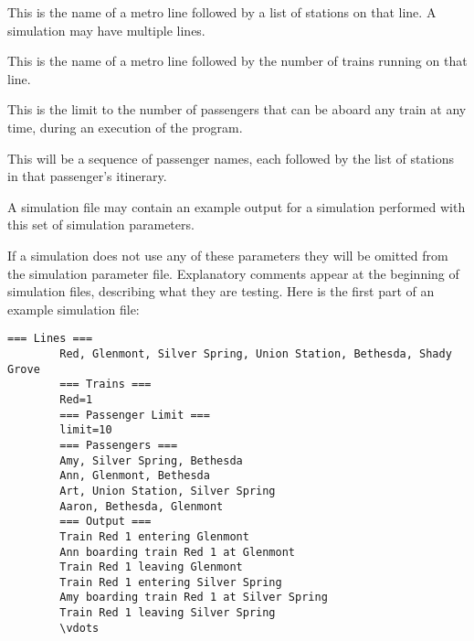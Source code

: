 \documentclass[11pt]{article}
\begin{document}
      \begin{description}

        \addtolength{\itemsep}{-1.5mm}

        \item[Metro lines:] This is the name of a metro line followed by a
              list of stations on that line.  A simulation may have multiple
              lines.

        \item[Metro trains:] This is the name of a metro line followed by
              the number of trains running on that line.

        \item[Passenger limit:] This is the limit to the number of
              passengers that can be aboard any train at any time, during an
              execution of the program.

        \item[Passengers:] This will be a sequence of passenger names, each
              followed by the list of stations in that passenger's itinerary.

        \item[Simulation output:] A simulation file may contain an example
              output for a simulation performed with this set of simulation
              parameters.

      \end{description}

      \vspace{-2mm}

      If a simulation does not use any of these parameters they will be
    omitted from the simulation parameter file.  Explanatory comments appear
    at the beginning of simulation files, describing what they are testing.
    Here is the first part of an example simulation file:

      \vspace{-2mm}

      \begin{center}

        \begin{BVerbatim}[commandchars=\\\{\}]
        === Lines ===
        Red, Glenmont, Silver Spring, Union Station, Bethesda, Shady Grove
        === Trains ===
        Red=1
        === Passenger Limit ===
        limit=10
        === Passengers ===
        Amy, Silver Spring, Bethesda
        Ann, Glenmont, Bethesda
        Art, Union Station, Silver Spring
        Aaron, Bethesda, Glenmont
        === Output ===
        Train Red 1 entering Glenmont
        Ann boarding train Red 1 at Glenmont
        Train Red 1 leaving Glenmont
        Train Red 1 entering Silver Spring
        Amy boarding train Red 1 at Silver Spring
        Train Red 1 leaving Silver Spring
        \vdots
        \end{BVerbatim}

      \end{center}
\end{document}

